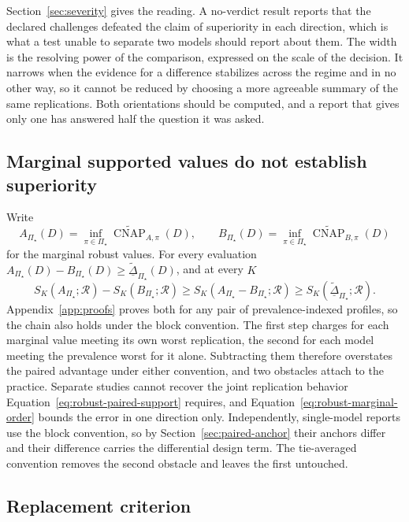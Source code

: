 \documentclass[11pt]{article}
\newcommand{\CNAP}{\operatorname{CNAP}}
\newcommand{\Regime}{\mathcal{R}}
\newcommand{\PSet}{\Pi_\star}
\newcommand{\CNAPta}{\widetilde{\CNAP}}
\newcommand{\RobDta}{\underline{\widetilde{\Delta}}_{\PSet}}
\theoremstyle{remark}
\begin{document}
Section~\ref{sec:severity} gives the reading. A no-verdict result reports that the declared challenges defeated the claim of superiority in each direction, which is what a test unable to separate two models should report about them. The width is the resolving power of the comparison, expressed on the scale of the decision. It narrows when the evidence for a difference stabilizes across the regime and in no other way, so it cannot be reduced by choosing a more agreeable summary of the same replications. Both orientations should be computed, and a report that gives only one has answered half the question it was asked.

\subsection{Marginal supported values do not establish superiority}

Write
\[
A_{\PSet}(D)
=
\inf_{\pi\in\PSet}\CNAPta_{A,\pi}(D),
\qquad
B_{\PSet}(D)
=
\inf_{\pi\in\PSet}\CNAPta_{B,\pi}(D)
\]
for the marginal robust values. For every evaluation $A_{\PSet}(D)-B_{\PSet}(D)\geq\RobDta(D)$, and at every $K$
\begin{equation}
S_K(A_{\PSet};\Regime)
-
S_K(B_{\PSet};\Regime)
\geq
S_K(A_{\PSet}-B_{\PSet};\Regime)
\geq
S_K(\RobDta;\Regime).
\label{eq:robust-marginal-order}
\end{equation}
Appendix~\ref{app:proofs} proves both for any pair of prevalence-indexed profiles, so the chain also holds under the block convention. The first step charges for each marginal value meeting its own worst replication, the second for each model meeting the prevalence worst for it alone. Subtracting them therefore overstates the paired advantage under either convention, and two obstacles attach to the practice. Separate studies cannot recover the joint replication behavior Equation~\eqref{eq:robust-paired-support} requires, and Equation~\eqref{eq:robust-marginal-order} bounds the error in one direction only. Independently, single-model reports use the block convention, so by Section~\ref{sec:paired-anchor} their anchors differ and their difference carries the differential design term. The tie-averaged convention removes the second obstacle and leaves the first untouched.

\subsection{Replacement criterion}
\label{sec:replacement}
\end{document}
